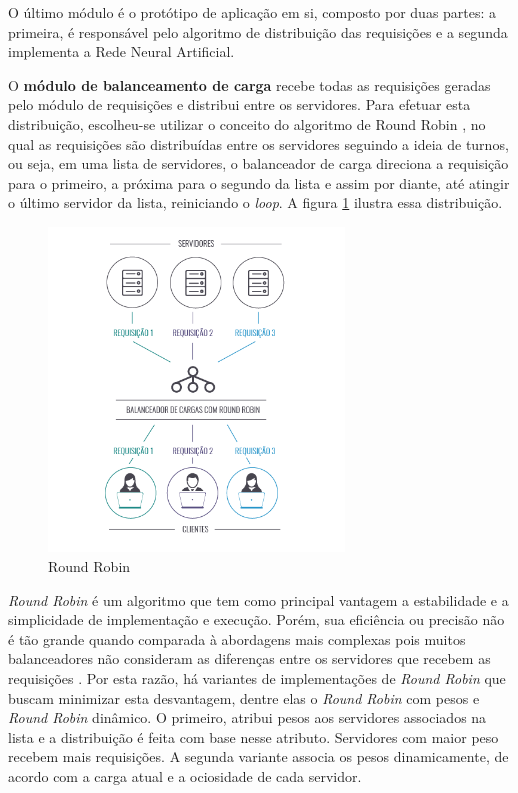 O último módulo é o protótipo de aplicação em si, composto por duas partes: a primeira, é responsável pelo algoritmo de distribuição das requisições e a segunda implementa a Rede Neural Artificial. 

O \textbf{módulo de balanceamento de carga} recebe todas as requisições geradas pelo módulo de requisições e distribui entre os servidores. Para efetuar esta distribuição, escolheu-se utilizar o conceito do algoritmo de Round Robin \cite{nginx-rr}, no qual as requisições são distribuídas entre os servidores seguindo a ideia de turnos, ou seja, em uma lista de servidores, o balanceador de carga direciona a requisição para o primeiro, a próxima para o segundo da lista e assim por diante, até atingir o último servidor da lista, reiniciando o \textit{loop}. A figura \ref{fig:round} ilustra essa distribuição. 
\begin{figure}[htb]
	\caption{\label{fig:round}Round Robin}
	\begin{center}
		\includegraphics[width=0.70\textwidth]{img/rrobin-01.png}
	\end{center}
\end{figure}

\textit{Round Robin} é um algoritmo que tem como principal vantagem a estabilidade e a simplicidade de implementação e execução. Porém, sua eficiência ou precisão não é tão grande quando comparada à abordagens mais complexas pois muitos balanceadores não consideram as diferenças entre os servidores que recebem as requisições \cite{nginx-rr}. Por esta razão, há variantes de implementações de \textit{Round Robin} que buscam minimizar esta desvantagem, dentre elas o \textit{Round Robin} com pesos e \textit{Round Robin} dinâmico. O primeiro, atribui pesos aos servidores associados na lista e a distribuição é feita com base nesse atributo. Servidores com maior peso recebem mais requisições. A segunda variante associa os pesos dinamicamente, de acordo com a carga atual e a ociosidade de cada servidor. 

